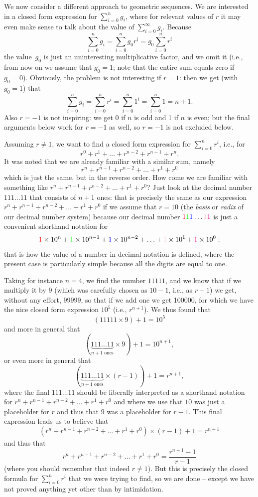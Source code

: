 \documentclass[titlepage]{article}
\theoremstyle{definition}
\numberwithin{equation}{subsection}
\numberwithin{remark}{subsection}
\begin{document}
We now consider a different approach to geometric sequences. We are interested in a closed form expression for $\sum_{i=0}^ng_i$, where for relevant values of $r$ it may even make sense to talk about the value of $\sum_{i=0}^\infty g_i$.
Because $$\sum_{i=0}^ng_i=\sum_{i=0}^ng_0r^i=g_0\sum_{i=0}^nr^i$$
the value~$g_0$ is just an uninteresting multiplicative factor, and we omit it (i.e., from now on we assume that $g_0=1$; note that the entire sum equals zero if $g_0=0$).
Obviously, the problem is not interesting if $r=1$: then we get (with $g_0=1$) that
$$\sum_{i=0}^ng_i=\sum_{i=0}^nr^i=\sum_{i=0}^n1^i=\sum_{i=0}^n1=n+1.$$
Also $r=-1$ is not inspiring: we get 0 if $n$ is odd and 1 if $n$ is even; but the final arguments below work for $r=-1$ as well, so $r=-1$ is not excluded below.

Assuming $r\ne1$, we want to find a closed form expression for $\sum_{i=0}^nr^i$, i.e., for $$r^0+r^1+\ldots+r^{n-2}+r^{n-1}+r^n.$$
It was noted that we are already familiar with a similar sum, namely $$r^n+r^{n-1}+r^{n-2}+\ldots+r^1+r^0$$
which is just the same, but in the reverse order.
How come we are familiar with something like $r^n+r^{n-1}+r^{n-2}+\ldots+r^1+r^0$?
Just look at the decimal number $111\ldots11$ that consists of $n+1$ ones:
that is precisely the same as our expression $r^n+r^{n-1}+r^{n-2}+\ldots+r^1+r^0$ if we assume that $r=10$ (the \emph{basis} or \emph{radix} of our decimal number system) because our decimal number ${\color{red}{1}}{\color{green}{1}}{\color{blue}{1}}\ldots{\color{pink}{1}}{\color{magenta}{1}}$ is just a convenient shorthand notation for
$${\color{red}{1}}\times10^n+{\color{green}{1}}\times10^{n-1}+{\color{blue}{1}}\times10^{n-2}+\ldots+{\color{pink}{1}}\times10^1+{\color{magenta}{1}}\times10^0:$$
that is how the value of a number in decimal notation is defined, where the present case is particularly simple because all the digits are equal to one.

Taking for instance $n=4$, we find the number $11111$, and we know that if we multiply it by $9$ (which was carefully chosen as $10-1$, i.e., as $r-1$) we get, without any effort, $99999$, so that if we add one we get 100000, for which we have the nice closed form expression $10^5$ (i.e., $r^{n+1}$). We thus found that $$(11111\times 9)+1=10^5$$
and more in general that
$$(\underbrace{111\ldots11}_{n+1 \text{ ones}}\times 9)+1=10^{n+1},$$
or even more in general that
$$(\underbrace{111\ldots11}_{n+1 \text{ ones}}\times (r-1))+1=r^{n+1},$$
where the final $111\ldots11$ should be liberally interpreted as a shorthand notation for $r^n+r^{n-1}+r^{n-2}+\ldots+r^1+r^0$
and where we use that $10$ was just a placeholder for $r$ and thus that $9$ was a placeholder for $r-1$. This final expression leads us to believe that
$$\underline{(r^n+r^{n-1}+r^{n-2}+\ldots+r^1+r^0)\times(r-1)}+1=r^{n+1}$$
and thus that
$$r^n+r^{n-1}+r^{n-2}+\ldots+r^1+r^0=\frac{r^{n+1}-1}{r-1}$$
(where you should remember that indeed $r\ne 1$). But this is precisely the closed formula for $\sum_{i=0}^nr^i$ that we were trying to find, so we are done -- except we have not proved anything yet other than by intimidation.
\end{document}
